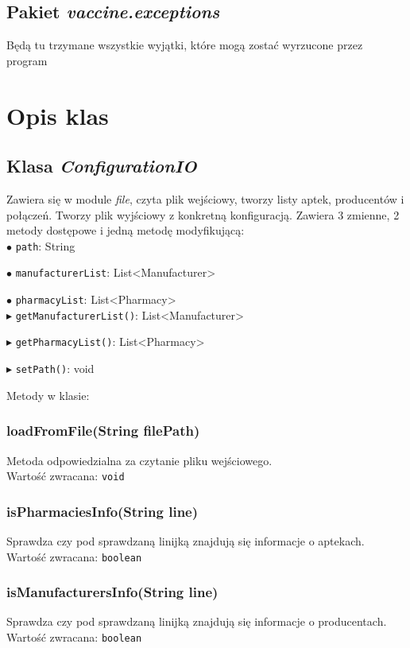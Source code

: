 \documentclass[]{article}
\begin{document}
    \subsection{Pakiet \textit{vaccine.exceptions}}
    Będą tu trzymane wszystkie wyjątki, które mogą zostać wyrzucone przez program


    \section{Opis klas }

    \subsection{Klasa \textit{ConfigurationIO}}
    Zawiera się w module \textit{file}, czyta plik wejściowy, tworzy listy aptek, producentów i połączeń. Tworzy plik wyjściowy z konkretną konfiguracją. Zawiera 3 zmienne, 2 metody dostępowe i jedną metodę modyfikującą:\\

    $\bullet$ \verb|path|: String

    $\bullet$ \verb|manufacturerList|: List<Manufacturer>

    $\bullet$ \verb|pharmacyList|: List<Pharmacy>\\

    $ \blacktriangleright $ \verb|getManufacturerList()|: List<Manufacturer>

    $ \blacktriangleright $ \verb|getPharmacyList()|: List<Pharmacy>

    $ \blacktriangleright $ \verb|setPath()|: void

    Metody w klasie:

    \subsubsection{loadFromFile(String filePath)}
    Metoda odpowiedzialna za czytanie pliku wejściowego.\\
    Wartość zwracana: \verb|void|

    \subsubsection{isPharmaciesInfo(String line)}
    Sprawdza czy pod sprawdzaną linijką znajdują się informacje o aptekach.\\
    Wartość zwracana: \verb|boolean|

    \subsubsection{isManufacturersInfo(String line)}
    Sprawdza czy pod sprawdzaną linijką znajdują się informacje o producentach.\\
    Wartość zwracana: \verb|boolean|
\end{document}
